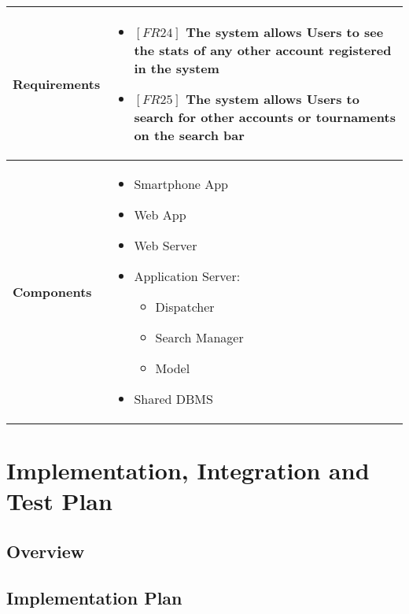 \documentclass{article}
\begin{document}
\begin{table}[H]
 \renewcommand{\arraystretch}{1.5}
    \centering
    \begin{tabular}{|l|p{10cm}|}
        \hline
        \textbf{Requirements} &
        \vspace{-0.6cm}
        \begin{itemize}[label={}, left=0pt, align=left, itemsep=5pt]
            \item $[FR24]$ The system allows Users to see the stats of any other account registered in the system
            \item $[FR25]$ The system allows Users to search for other accounts or tournaments on the search bar
        \end{itemize} \\
        \hline
        \textbf{Components} & 
        \begin{itemize}[align=left, topsep=0pt, partopsep=0pt]
            \item Smartphone App
            \item Web App
            \item Web Server
            \item Application Server:
            \begin{itemize}
                \item Dispatcher
                \item Search Manager
                \item Model
            \end{itemize}
            \item Shared DBMS 
        \end{itemize} \\
        \hline
    \end{tabular}
\end{table}

\section{Implementation, Integration and Test Plan}
\subsection{Overview}
\subsection{Implementation Plan}
\end{document}
